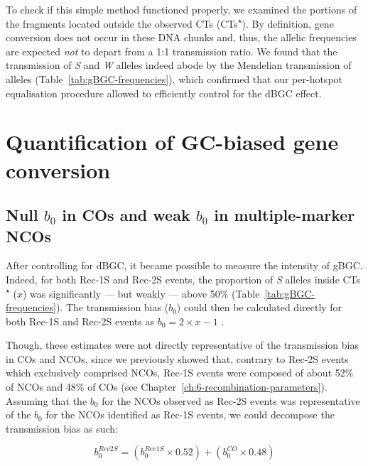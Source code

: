 To check if this simple method functioned properly, we examined the portions of the fragments located outside the observed CTs (CTs\textsuperscript{$\star$}).
By definition, gene conversion does not occur in these DNA chunks and, thus, the allelic frequencies are expected \textit{not} to depart from a 1:1 transmission ratio.
We found that the transmission of \textit{S} and \textit{W} alleles indeed abode by the Mendelian transmission of alleles (Table~\ref{tab:gBGC-frequencies}), which confirmed that our per-hotspot equalisation procedure allowed to efficiently control for the dBGC effect. 





\section{Quantification of GC-biased gene conversion}
\subsection{Null $b_0$ in COs and weak $b_0$ in multiple-marker NCOs}

After controlling for dBGC, it became possible to measure the intensity of gBGC\@.
Indeed, for both Rec-1S and Rec-2S events, the proportion of \textit{S} alleles inside CTs\textsuperscript{$\star$} ($x$) was significantly — but weakly — above 50\% (Table~\ref{tab:gBGC-frequencies}).
The transmission bias ($b_0$) could then be calculated directly for both Rec-1S and Rec-2S events as ${b_0 = 2 \times x - 1}$ \citep{nagylaki1983evolution}.

Though, these estimates were not directly representative of the transmission bias in COs and NCOs, since we previously showed that, contrary to Rec-2S events which exclusively comprised NCOs, Rec-1S events were composed of about 52\% of NCOs and 48\% of COs (see Chapter~\ref{ch:6-recombination-parameters}). 
Assuming that the $b_0$ for the NCOs observed as Rec-2S events was representative of the $b_0$ for the NCOs identified as Rec-1S events, we could decompose the transmission bias as such: 

\begin{equation*}
	b_0^{Rec2S} = (b_0^{Rec1S} \times 0.52) + (b_0^{CO} \times 0.48)
\end{equation*}

